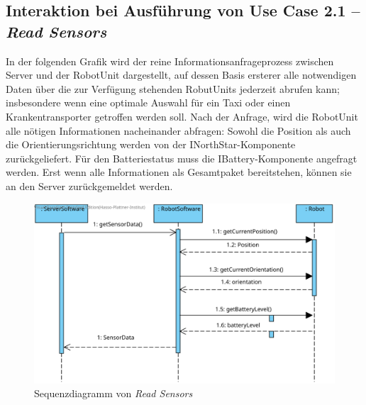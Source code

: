 	\subsection*{Interaktion bei Ausführung von Use Case 2.1 – \emph{Read Sensors}}
In der folgenden Grafik wird der reine Informationsanfrageprozess zwischen Server und der RobotUnit dargestellt, auf dessen Basis ersterer alle notwendigen Daten über die zur Verfügung stehenden RobutUnits jederzeit abrufen kann; insbesondere wenn eine optimale Auswahl für ein Taxi oder einen Krankentransporter getroffen werden soll. 
Nach der Anfrage, wird die RobotUnit alle nötigen Informationen nacheinander abfragen: Sowohl die Position als auch die Orientierungsrichtung werden von der INorthStar-Komponente zurückgeliefert. 
Für den Batteriestatus muss die IBattery-Komponente angefragt werden. 
Erst wenn alle Informationen als Gesamtpaket bereitstehen, können sie an den Server zurückgemeldet werden.
\\

	\begin{figure}[H]
		\centering
		\includegraphics[width=1\textwidth]{img/0-Entwurf-8-ReadSens}
		\caption{Sequenzdiagramm von \emph{Read Sensors}}
		\label{ReadSensors}
	\end{figure}

	
